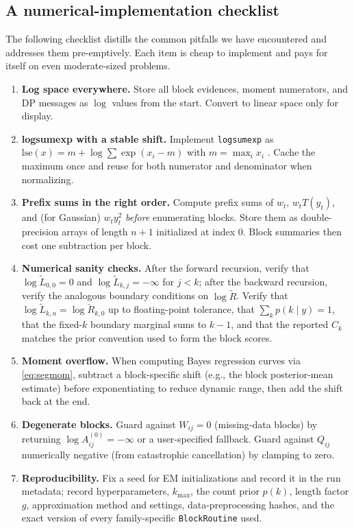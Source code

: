 \subsection{A numerical-implementation checklist}
\label{sec:alg-checklist}

The following checklist distills the common pitfalls we have encountered and addresses them
pre-emptively. Each item is cheap to implement and pays for itself on even moderate-sized
problems.

\begin{enumerate}\itemsep2pt
\item \textbf{Log space everywhere.} Store all block evidences, moment numerators, and DP
messages as $\log$ values from the start. Convert to linear space only for display.
\item \textbf{logsumexp with a stable shift.} Implement \texttt{logsumexp} as
$\mathrm{lse}(x)=m+\log\sum\exp(x_i-m)$ with $m=\max_i x_i$ \citep{blanchard2021lse}. Cache the
maximum once and reuse for both numerator and denominator when normalizing.
\item \textbf{Prefix sums in the right order.} Compute prefix sums of $w_t$, $w_t T(y_t)$, and
(for Gaussian) $w_t y_t^2$ \emph{before} enumerating blocks. Store them as double-precision arrays
of length $n+1$ initialized at index 0. Block summaries then cost one subtraction per block.
\item \textbf{Numerical sanity checks.} After the forward recursion, verify that
$\log\widetilde L_{0,0}=0$ and $\log\widetilde L_{k,j}=-\infty$ for $j<k$; after the backward
recursion, verify the analogous boundary conditions on $\log\widetilde R$. Verify that
$\log\widetilde L_{k,n}=\log\widetilde R_{k,0}$ up to floating-point tolerance, that
$\sum_k p(k\mid y)=1$, that the fixed-$k$ boundary marginal sums to $k-1$, and that the reported
$C_k$ matches the prior convention used to form the block scores.
\item \textbf{Moment overflow.} When computing Bayes regression curves via \eqref{eq:segmom},
subtract a block-specific shift (e.g., the block posterior-mean estimate) before exponentiating
to reduce dynamic range, then add the shift back at the end.
\item \textbf{Degenerate blocks.} Guard against $W_{ij}=0$ (missing-data blocks) by returning
$\log A^{(0)}_{ij}=-\infty$ or a user-specified fallback. Guard against $Q_{ij}$ numerically
negative (from catastrophic cancellation) by clamping to zero.
\item \textbf{Reproducibility.} Fix a seed for EM initializations and record it in the run
metadata; record hyperparameters, $k_{\max}$, the count prior $p(k)$, length factor $g$, approximation
method and settings, data-preprocessing hashes, and the exact version of every family-specific
\texttt{BlockRoutine} used.
\end{enumerate}
